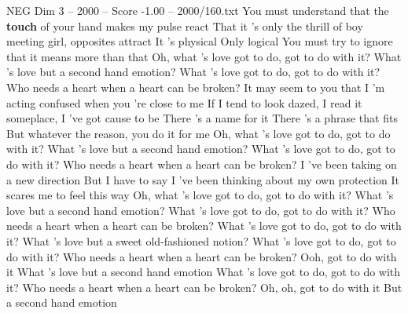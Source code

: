 \begin{textsample}{NEG Dim 3 – 2000 – Score -1.00 – 2000/160.txt}  \label{ex:f3_neg_015}
You must understand that the \textbf{touch} of your hand makes my pulse react That it 's only the thrill of boy meeting girl, opposites attract It 's physical Only logical You must try to ignore that it means more than that Oh, what 's love got to do, got to do with it?
What 's love but a second hand emotion?
What 's love got to do, got to do with it?
Who needs a heart when a heart can be broken?
It may seem to you that I 'm acting confused when you 're close to me If I tend to look dazed, I read it someplace, I 've got cause to be There 's a name for it There 's a phrase that fits But whatever the reason, you do it for me Oh, what 's love got to do, got to do with it?
What 's love but a second hand emotion?
What 's love got to do, got to do with it?
Who needs a heart when a heart can be broken?
I 've been taking on a new direction But I have to say I 've been thinking about my own protection It scares me to feel this way Oh, what 's love got to do, got to do with it?
What 's love but a second hand emotion?
What 's love got to do, got to do with it?
Who needs a heart when a heart can be broken?
What 's love got to do, got to do with it?
What 's love but a sweet old-fashioned notion?
What 's love got to do, got to do with it?
Who needs a heart when a heart can be broken?
Ooh, got to do with it What 's love but a second hand emotion What 's love got to do, got to do with it?
Who needs a heart when a heart can be broken?
Oh, oh, got to do with it But a second hand emotion

\end{textsample}
